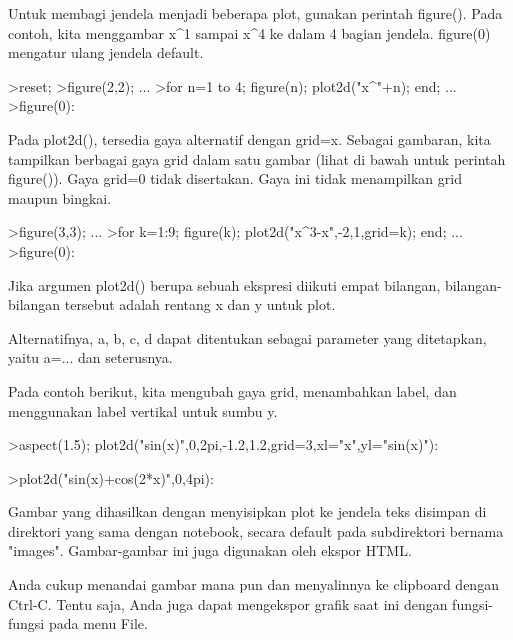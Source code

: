 \documentclass[a4paper,10pt]{article}
\begin{document}
\begin{eulernotebook}
\begin{eulercomment}
\begin{eulercomment}
\begin{eulercomment}
\begin{eulercomment}
\begin{eulercomment}
\begin{eulercomment}
\begin{eulercomment}
Untuk membagi jendela menjadi beberapa plot, gunakan perintah figure(). Pada contoh,
kita menggambar x\textasciicircum{}1 sampai x\textasciicircum{}4 ke dalam 4 bagian jendela. figure(0) mengatur ulang
jendela default.
\end{eulercomment}
\begin{eulerprompt}
>reset;
>figure(2,2); ...
>for n=1 to 4; figure(n); plot2d("x^"+n); end; ...
>figure(0):
\end{eulerprompt}
\begin{eulercomment}
Pada plot2d(), tersedia gaya alternatif dengan grid=x. Sebagai gambaran, kita
tampilkan berbagai gaya grid dalam satu gambar (lihat di bawah untuk perintah
figure()). Gaya grid=0 tidak disertakan. Gaya ini tidak menampilkan grid maupun
bingkai.
\end{eulercomment}
\begin{eulerprompt}
>figure(3,3); ...
>for k=1:9; figure(k); plot2d("x^3-x",-2,1,grid=k); end; ...
>figure(0):
\end{eulerprompt}
\begin{eulercomment}
Jika argumen plot2d() berupa sebuah ekspresi diikuti empat bilangan, bilangan-bilangan
tersebut adalah rentang x dan y untuk plot.

Alternatifnya, a, b, c, d dapat ditentukan sebagai parameter yang ditetapkan, yaitu
a=... dan seterusnya.

Pada contoh berikut, kita mengubah gaya grid, menambahkan label, dan menggunakan label
vertikal untuk sumbu y.
\end{eulercomment}
\begin{eulerprompt}
>aspect(1.5); plot2d("sin(x)",0,2pi,-1.2,1.2,grid=3,xl="x",yl="sin(x)"):
\end{eulerprompt}
\begin{eulerprompt}
>plot2d("sin(x)+cos(2*x)",0,4pi):
\end{eulerprompt}
\begin{eulercomment}
Gambar yang dihasilkan dengan menyisipkan plot ke jendela teks disimpan di direktori
yang sama dengan notebook, secara default pada subdirektori bernama "images".
Gambar-gambar ini juga digunakan oleh ekspor HTML.

Anda cukup menandai gambar mana pun dan menyalinnya ke clipboard dengan Ctrl-C. Tentu
saja, Anda juga dapat mengekspor grafik saat ini dengan fungsi-fungsi pada menu File.


\end{eulercomment}
\end{eulercomment}
\end{eulercomment}
\end{eulercomment}
\end{eulercomment}
\end{eulercomment}
\end{eulercomment}
\end{eulernotebook}
\end{document}
